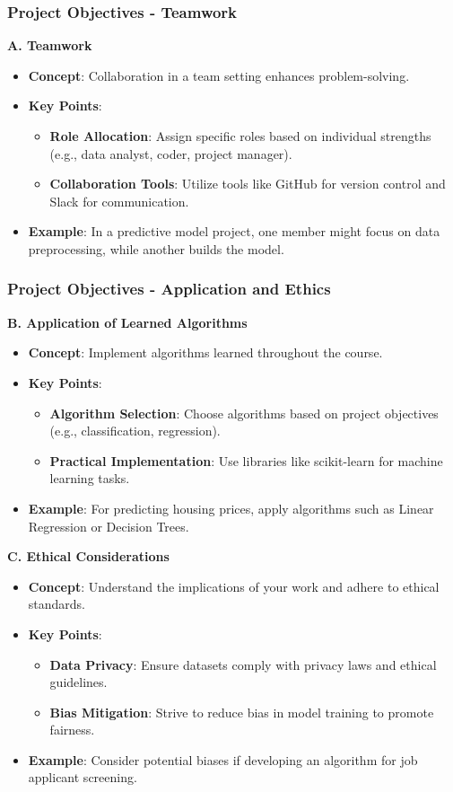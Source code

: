 \documentclass[aspectratio=169]{beamer}
\begin{document}
\begin{frame}[fragile]
    \frametitle{Project Objectives - Teamwork}
    \textbf{A. Teamwork}
    \begin{itemize}
        \item \textbf{Concept}: Collaboration in a team setting enhances problem-solving.
        \item \textbf{Key Points}:
        \begin{itemize}
            \item \textbf{Role Allocation}: Assign specific roles based on individual strengths (e.g., data analyst, coder, project manager).
            \item \textbf{Collaboration Tools}: Utilize tools like GitHub for version control and Slack for communication.
        \end{itemize}
        \item \textbf{Example}: In a predictive model project, one member might focus on data preprocessing, while another builds the model.
    \end{itemize}
\end{frame}

\begin{frame}[fragile]
    \frametitle{Project Objectives - Application and Ethics}
    \textbf{B. Application of Learned Algorithms}
    \begin{itemize}
        \item \textbf{Concept}: Implement algorithms learned throughout the course.
        \item \textbf{Key Points}:
        \begin{itemize}
            \item \textbf{Algorithm Selection}: Choose algorithms based on project objectives (e.g., classification, regression).
            \item \textbf{Practical Implementation}: Use libraries like scikit-learn for machine learning tasks.
        \end{itemize}
        \item \textbf{Example}: For predicting housing prices, apply algorithms such as Linear Regression or Decision Trees.
    \end{itemize}
    
    \textbf{C. Ethical Considerations}
    \begin{itemize}
        \item \textbf{Concept}: Understand the implications of your work and adhere to ethical standards.
        \item \textbf{Key Points}:
        \begin{itemize}
            \item \textbf{Data Privacy}: Ensure datasets comply with privacy laws and ethical guidelines.
            \item \textbf{Bias Mitigation}: Strive to reduce bias in model training to promote fairness.
        \end{itemize}
        \item \textbf{Example}: Consider potential biases if developing an algorithm for job applicant screening.
    \end{itemize}
\end{frame}
\end{document}
